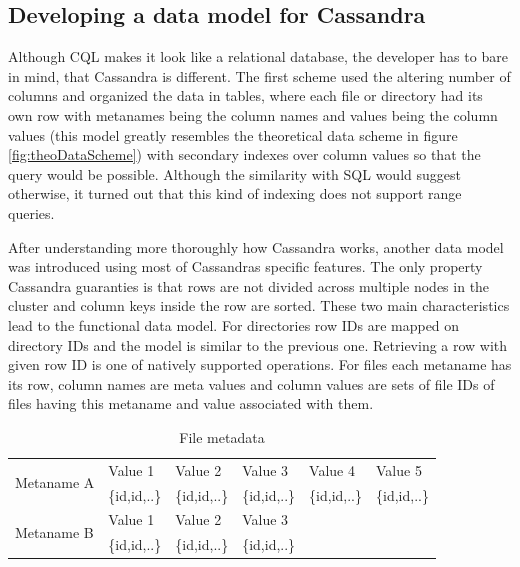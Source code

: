 \subsection{Developing a data model for Cassandra}

Although CQL makes it look like a relational database, the developer has to bare in mind, that
Cassandra is different. The first scheme used the altering number of columns and organized the 
data in tables, where each file or directory had its own row with metanames being the column
names and values being the column values (this model greatly resembles the theoretical data 
scheme in figure \ref{fig:theoDataScheme}) with secondary indexes over column values so that 
the query would be possible. Although the similarity with SQL would suggest otherwise, 
it turned out that this kind of indexing does not support range queries. 

After understanding more thoroughly how Cassandra works, another data model was introduced 
using most of Cassandras specific features. The only property Cassandra guaranties is that 
rows are not divided across multiple nodes in the cluster and column keys inside the row
are sorted. These two main characteristics lead to the functional data model. For  
directories row IDs are mapped on directory IDs and the model is similar to the previous one. 
Retrieving a row with given row ID is one of natively supported operations.
For files each metaname has its row, column names are meta values and column values are sets of 
file IDs of files having this metaname and value associated with them. 

\begin{table}[h]
\centering
\label{tab:fileMeta}
\begin{tabular}{|l|l|l|l|ll}
\hline
\multirow{2}{*}{Metaname A} & Value 1      & Value 2      & Value 3      & \multicolumn{1}{l|}{Value 4}      & \multicolumn{1}{l|}{Value 5}      \\ \cline{2-6}
                            & \{id,id,..\} & \{id,id,..\} & \{id,id,..\} & \multicolumn{1}{l|}{\{id,id,..\}} & \multicolumn{1}{l|}{\{id,id,..\}} \\ \hline
\multirow{2}{*}{Metaname B} & Value 1      & Value 2      & Value 3      &                                   &                                   \\ \cline{2-4}
                            & \{id,id,..\} & \{id,id,..\} & \{id,id,..\} &                                   &                                   \\ \cline{1-4}
\end{tabular}
\caption{File metadata}
\end{table}


